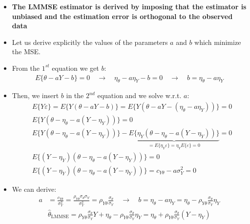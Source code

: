 \begin{itemize}
\item \textbf{The LMMSE estimator is derived by imposing that the estimator is unbiased and the estimation error is orthogonal to the observed data}
\item Let us derive explicitly the values of the parameters \(a\) and \(b\) which minimize the MSE.
\item From the \(1^{st}\) equation we get \(b\):
\begin{align*}
E\{\theta - aY - b\} = 0 \quad \rightarrow \quad \eta_{\theta} - a\eta_{Y} - b = 0 \quad \rightarrow \quad b = \eta_{\theta} - a\eta_{Y}
\end{align*}
\item Then, we insert \(b\) in the \(2^{nd}\) equation and we solve w.r.t. \(a\):
\begin{align*}
&E\{Y\varepsilon\} = E\{Y(\theta - aY - b)\} = E\{Y(\theta - aY - (\eta_{\theta} - a\eta_{Y}))\} = 0 \\[8pt]
&E\{Y(\theta - \eta_{\theta} - a(Y - \eta_{Y}))\} = 0 \\[8pt]
&E\{Y(\theta - \eta_{\theta} - a(Y - \eta_{Y}))\} - \underbrace{E\{\eta_{Y}(\theta - \eta_{\theta} - a(Y - \eta_{Y}))\}}_{=E\{\eta_{Y} \varepsilon\} = \eta_{Y} E\{\varepsilon\}=0} = 0 \\[8pt]
&E\{(Y - \eta_{Y})(\theta - \eta_{\theta} - a(Y - \eta_{Y}))\}=0 \\[8pt]
&E\{(Y - \eta_{Y})(\theta - \eta_{\theta} - a(Y - \eta_{Y}))\} = c_{Y\theta} - a\sigma_{Y}^2 = 0
\end{align*}
\item We can derive:
\begin{align*}
a &= \frac{c_{Y\theta}}{\sigma_{Y}^2} = \frac{\rho_{Y\theta}\sigma_{\theta}\sigma_{Y}}{\sigma_{Y}^2} = \rho_{Y\theta}\frac{\sigma_{\theta}}{\sigma_{Y}} \quad \rightarrow \quad b = \eta_{\theta} - a\eta_{Y} = \eta_{\theta} - \rho_{Y\theta}\frac{\sigma_{\theta}}{\sigma_{Y}}\eta_{Y} \\[8pt]
&\hat{\theta}_{\text{LMMSE}} = \rho_{Y\theta}\frac{\sigma_{\theta}}{\sigma_{Y}}Y + \eta_{\theta} - \rho_{Y\theta}\frac{\sigma_{\theta}}{\sigma_{Y}}\eta_{Y} = \eta_{\theta} + \rho_{Y\theta}\frac{\sigma_{\theta}}{\sigma_{Y}}(Y - \eta_{Y})
\end{align*}


\end{itemize}
